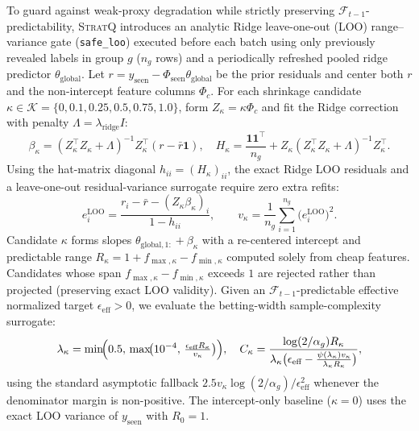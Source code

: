 To guard against weak-proxy degradation while strictly preserving $\mathcal F_{t-1}$-predictability, \textsc{StratQ} introduces an analytic Ridge leave-one-out (LOO) range--variance gate (\texttt{safe\_loo}) executed before each batch using only previously revealed labels in group $g$ ($n_g$ rows) and a periodically refreshed pooled ridge predictor $\theta_{\text{global}}$.
Let $r = y_{\text{seen}} - \Phi_{\text{seen}} \theta_{\text{global}}$ be the prior residuals and center both $r$ and the non-intercept feature columns $\Phi_c$.
For each shrinkage candidate $\kappa \in \mathcal{K} = \{0, 0.1, 0.25, 0.5, 0.75, 1.0\}$, form $Z_\kappa = \kappa \Phi_c$ and fit the Ridge correction with penalty $\Lambda = \lambda_{\text{ridge}} I$:
\begin{equation}
  \beta_\kappa = (Z_\kappa^\top Z_\kappa + \Lambda)^{-1} Z_\kappa^\top (r - \bar{r}\mathbf{1}), \quad
  H_\kappa = \frac{\mathbf{1}\mathbf{1}^\top}{n_g} + Z_\kappa (Z_\kappa^\top Z_\kappa + \Lambda)^{-1} Z_\kappa^\top.
  \label{eq:ridge-hat}
\end{equation}
Using the hat-matrix diagonal $h_{ii} = (H_\kappa)_{ii}$, the exact Ridge LOO residuals and a leave-one-out residual-variance surrogate require zero extra refits:
\begin{equation}
  e_i^{\text{LOO}} = \frac{r_i - \bar{r} - (Z_\kappa \beta_\kappa)_i}{1 - h_{ii}}, \qquad
  v_\kappa = \frac{1}{n_g}\sum_{i=1}^{n_g} \bigl(e_i^{\text{LOO}}\bigr)^2.
  \label{eq:loo-var}
\end{equation}
Candidate $\kappa$ forms slopes $\theta_{\text{global},1:} + \beta_\kappa$ with a re-centered intercept and predictable range $R_\kappa = 1 + f_{\max,\kappa} - f_{\min,\kappa}$ computed solely from cheap features.
Candidates whose span $f_{\max,\kappa} - f_{\min,\kappa}$ exceeds $1$ are rejected rather than projected (preserving exact LOO validity).
Given an $\mathcal{F}_{t-1}$-predictable effective normalized target $\epsilon_{\text{eff}} > 0$, we evaluate the betting-width sample-complexity surrogate:
\begin{equation}
  \lambda_\kappa = \min\!\Bigl(0.5,\, \max\!\bigl(10^{-4},\, \tfrac{\epsilon_{\text{eff}} R_\kappa}{v_\kappa}\bigr)\Bigr), \quad
  C_\kappa = \frac{\log(2/\alpha_g) R_\kappa}{\lambda_\kappa \bigl(\epsilon_{\text{eff}} - \tfrac{\psi(\lambda_\kappa) v_\kappa}{\lambda_\kappa R_\kappa}\bigr)},
  \label{eq:betting-cost}
\end{equation}
using the standard asymptotic fallback $2.5 v_\kappa \log(2/\alpha_g)/\epsilon_{\text{eff}}^2$ whenever the denominator margin is non-positive.
The intercept-only baseline ($\kappa = 0$) uses the exact LOO variance of $y_{\text{seen}}$ with $R_0 = 1$.

